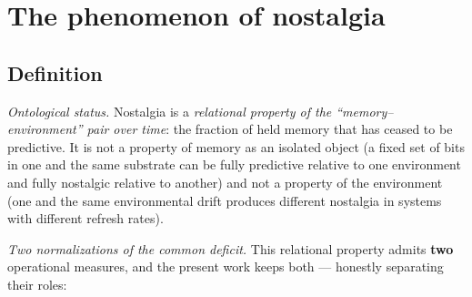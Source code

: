 \documentclass[pdflatex,sn-mathphys-ay]{sn-jnl}
\begin{document}
\section{The phenomenon of nostalgia}\label{the-phenomenon-of-nostalgia}



\subsection{Definition}\label{definition}



\emph{Ontological status.} Nostalgia is a \emph{relational property of the ``memory--environment'' pair over time}: the fraction of held memory that has ceased to be predictive. It is not a property of memory as an isolated object (a fixed set of bits in one and the same substrate can be fully predictive relative to one environment and fully nostalgic relative to another) and not a property of the environment (one and the same environmental drift produces different nostalgia in systems with different refresh rates).



\emph{Two normalizations of the common deficit.} This relational property admits \textbf{two} operational measures, and the present work keeps both --- honestly separating their roles:
\end{document}
